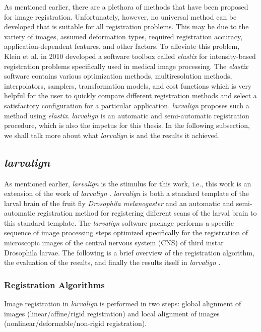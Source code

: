 \documentclass{report}
\begin{document}
	As mentioned earlier, there are a plethora of methods that have been proposed for image registration. Unfortunately, however, no universal method can be developed that is suitable for all registration problems. This may be due to the variety of images, assumed deformation types, required registration accuracy, application-dependent features, and other factors. To alleviate this problem, Klein et al. \cite{5338015} in 2010 developed a software toolbox called \emph{elastix} for intensity-based registration problems specifically used in medical image processing. The \emph{elastix} software contains various optimization methods, multiresolution methods, interpolators, samplers, transformation models, and cost functions which is very helpful for the user to quickly compare different registration methods and select a satisfactory configuration for a particular application. \emph{{larvalign}} \cite{larvalign} proposes such a method using \emph{elastix}. \emph{{larvalign}} \cite{larvalign} is an automatic and semi-automatic registration procedure, which is also the impetus for this thesis. In the following subsection, we shall talk more about what \emph{{larvalign}} is and the results it achieved.
	
	\subsection{\emph{larvalign}}
	As mentioned earlier, \emph{{larvalign}} \cite{larvalign} is the stimulus for this work, i.e., this work is an extension of the work of \emph{{larvalign}} \cite{larvalign}. \emph{{larvalign}} \cite{larvalign} is both a standard template of the larval brain of the fruit fly \emph{Drosophila melanogaster} and an automatic and semi-automatic registration method for registering different scans of the larval brain to this standard template. The \emph{{larvalign}} \cite{larvalign} software package performs a specific sequence of image processing steps optimized specifically for the registration of microscopic images of the central nervous system (CNS) of third instar Drosophila larvae. The following is a brief overview of the registration algorithm, the evaluation of the results, and finally the results itself in \emph{{larvalign}} \cite{larvalign}.
	
	\subsubsection{Registration Algorithms}
	\label{subsubsection:registration_algo}
	Image registration in \emph{{larvalign}} is performed in two steps: global alignment of images (linear/affine/rigid registration) and local alignment of images (nonlinear/deformable/non-rigid registration).
	
\end{document}

